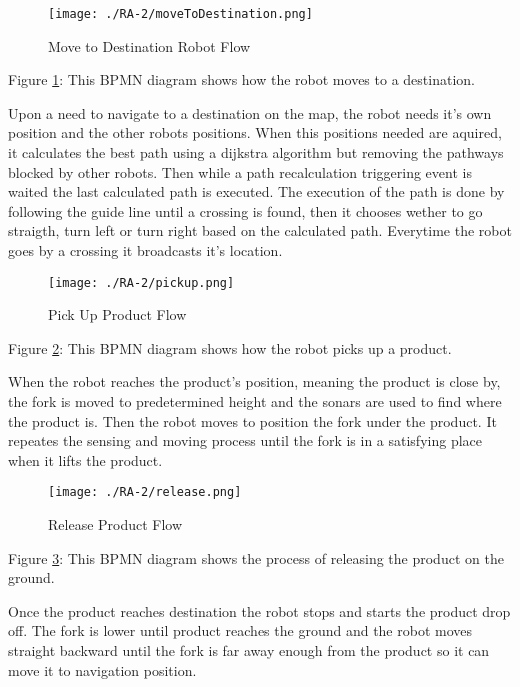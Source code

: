 \begin{figure}[ht!]
 \centering
 \texttt{[image: ./RA-2/moveToDestination.png]}
 \caption{Move to Destination Robot Flow}
 \label{fig:movetodestination}
\end{figure}
Figure \ref{fig:movetodestination}: This BPMN diagram shows how the robot moves to a destination.

Upon a need to navigate to a destination on the map, the robot needs it's own position and the other robots positions. When this positions needed are aquired, it calculates the best path using a dijkstra algorithm but removing the pathways blocked by other robots. Then while a path recalculation triggering event is waited the last calculated path is executed. The execution of the path is done by following the guide line until a crossing is found, then it chooses wether to go straigth, turn left or turn right based on the calculated path. Everytime the robot goes by a crossing it broadcasts it's location.

\begin{figure}[ht!]
 \centering
 \texttt{[image: ./RA-2/pickup.png]}
 \caption{Pick Up Product Flow}
 \label{fig:pickup}
\end{figure}

Figure \ref{fig:pickup}: This BPMN diagram shows how the robot picks up a product.

When the robot reaches the product's position, meaning the product is close by, the fork is moved to predetermined height and the sonars are used to find where the product is. Then the robot moves to position the fork under the product. It repeates the sensing and moving process until the fork is in a satisfying place when it lifts the product.

\begin{figure}[ht!]
 \centering
 \texttt{[image: ./RA-2/release.png]}
 \caption{Release Product Flow}
 \label{fig:release}
\end{figure}

Figure \ref{fig:release}: This BPMN diagram shows the process of releasing the product on the ground.

Once the product reaches destination the robot stops and starts the product drop off. The fork is lower until product reaches the ground and the robot moves straight backward until the fork is far away enough from the product so it can move it to navigation position.

